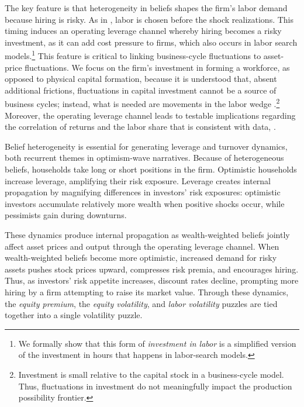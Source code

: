 The key feature is that heterogeneity in beliefs shapes the firm's labor demand because hiring is risky. As in \citet{burnside1993labor}, labor is chosen before the shock realizations. This timing induces an operating leverage channel whereby hiring becomes a risky investment, as it can add cost pressure to firms, which also occurs in labor search models.\footnote{We formally show that this form of \emph{investment in labor} is a simplified version of the investment in hours that happens in labor-search models.} This feature is critical to linking business-cycle fluctuations to asset-price fluctuations. We focus on the firm's investment in forming a workforce, as opposed to physical capital formation, because it is understood that, absent additional frictions, fluctuations in capital investment cannot be a source of business cycles; instead, what is needed are movements in the labor wedge \citep{CKM07}.\footnote{Investment is small relative to the capital stock in a business-cycle model. Thus, fluctuations in investment do not meaningfully impact the production possibility frontier.} Moreover, the operating leverage channel leads to testable implications regarding the correlation of returns and the labor share that is consistent with data, \citep[e.g., see][]{donangelo2019cross}.

Belief heterogeneity is essential for generating leverage and turnover dynamics, both recurrent themes in optimism-wave narratives. Because of heterogeneous beliefs, households take long or short positions in the firm. Optimistic households increase leverage, amplifying their risk exposure. Leverage creates internal propagation by magnifying differences in investors' risk exposures: optimistic investors accumulate relatively more wealth when positive shocks occur, while pessimists gain during downturns.

These dynamics produce internal propagation as wealth-weighted beliefs jointly affect asset prices and output through the operating leverage channel. When wealth-weighted beliefs become more optimistic, increased demand for risky assets pushes stock prices upward, compresses risk premia, and encourages hiring. Thus, as investors' risk appetite increases, discount rates decline, prompting more hiring by a firm attempting to raise its market value. Through these dynamics, the \emph{equity premium}, the \emph{equity volatility}, and \emph{labor volatility} puzzles are tied together into a single volatility puzzle. 

